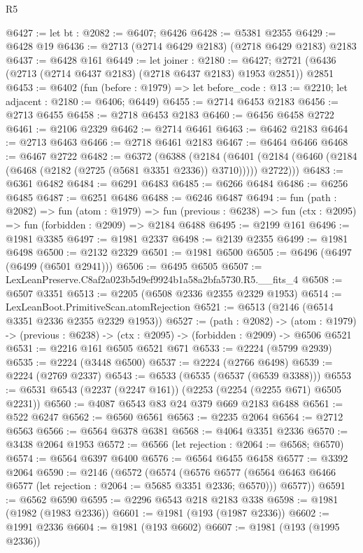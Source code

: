 \begin{lexlean}{R5}
\begin{coremodule}
@6427 := let bt : @2082 := @6407; @6426
@6428 := @5381 @2355
@6429 := @6428 @19
@6436 := @2713 (@2714 @6429 @2183) (@2718 @6429 @2183) @2183
@6437 := @6428 @161
@6449 := let joiner : @2180 := @6427;
  @2721 (@6436 (@2713 (@2714 @6437 @2183) (@2718 @6437 @2183) @1953 @2851)) @2851
@6453 := @6402
    (fun (before : @1979) => let before_code : @13 := @2210; let adjacent : @2180 := @6406; @6449)
@6455 := @2714 @6453 @2183
@6456 := @2713 @6455
@6458 := @2718 @6453 @2183
@6460 := @6456 @6458 @2722
@6461 := @2106 @2329
@6462 := @2714 @6461
@6463 := @6462 @2183
@6464 := @2713 @6463
@6466 := @2718 @6461 @2183
@6467 := @6464 @6466
@6468 := @6467 @2722
@6482 := @6372
    (@6388
      (@2184
        (@6401 (@2184 (@6460 (@2184 (@6468 (@2182 (@2725 (@5681 @3351 @2336)) @3710))))) @2722)))
@6483 := @6361 @6482
@6484 := @6291 @6483
@6485 := @6266 @6484
@6486 := @6256 @6485
@6487 := @6251 @6486
@6488 := @6246 @6487
@6494 := fun (path : @2082) =>
  fun (atom : @1979) =>
  fun (previous : @6238) => fun (ctx : @2095) => fun (forbidden : @2909) => @2184 @6488
@6495 := @2199 @161
@6496 := @1981 @3385
@6497 := @1981 @2337
@6498 := @2139 @2355
@6499 := @1981 @6498
@6500 := @2132 @2329
@6501 := @1981 @6500
@6505 := @6496 (@6497 (@6499 (@6501 @2941)))
@6506 := @6495 @6505
@6507 := LexLeanPreserve.C8af2a023b5d9ef9924b1a58a2bfa5730.R5.__fits_4
@6508 := @6507 @3351
@6513 := @2205 (@6508 @2336 @2355 @2329 @1953)
@6514 := LexLeanBoot.PrimitiveScan.atomRejection
@6521 := @6513 (@2146 (@6514 @3351 @2336 @2355 @2329 @1953))
@6527 := (path : @2082) ->
  (atom : @1979) -> (previous : @6238) -> (ctx : @2095) -> (forbidden : @2909) -> @6506 @6521
@6531 := @2216 @161 @6505 @6521 @671
@6533 := @2224 (@5799 @2939)
@6535 := @2224 (@3448 @6500)
@6537 := @2224 (@2766 @6498)
@6539 := @2224 (@2769 @2337)
@6543 := @6533 (@6535 (@6537 (@6539 @3388)))
@6553 := @6531 @6543 (@2237 (@2247 @161)) (@2253 (@2254 (@2255 @671) @6505 @2231))
@6560 := @4087 @6543 @83 @24 @379 @669 @2183 @6488
@6561 := @522 @6247
@6562 := @6560 @6561
@6563 := @2235 @2064
@6564 := @2712 @6563
@6566 := @6564 @6378 @6381
@6568 := @4064 @3351 @2336
@6570 := @3438 @2064 @1953
@6572 := @6566 (let rejection : @2064 := @6568; @6570)
@6574 := @6564 @6397 @6400
@6576 := @6564 @6455 @6458
@6577 := @3392 @2064
@6590 := @2146
    (@6572
      (@6574
        (@6576 @6577 (@6564 @6463 @6466 @6577 (let rejection : @2064 := @5685 @3351 @2336; @6570)))
        @6577))
@6591 := @6562 @6590
@6595 := @2296 @6543 @218 @2183 @338
@6598 := @1981 (@1982 (@1983 @2336))
@6601 := @1981 (@193 (@1987 @2336))
@6602 := @1991 @2336
@6604 := @1981 (@193 @6602)
@6607 := @1981 (@193 (@1995 @2336))

\end{coremodule}
\end{lexlean}
